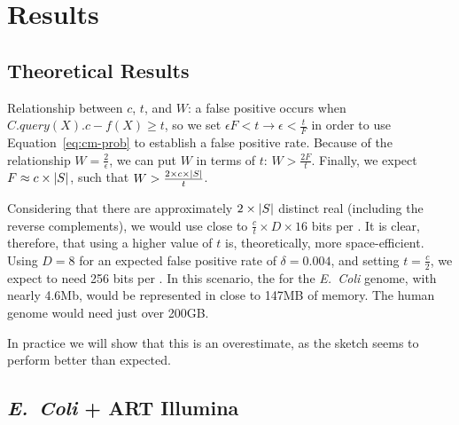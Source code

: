 \chapter{Results}

\section{Theoretical Results}


Relationship between $c$, $t$, and $W$: a false positive occurs when $C.\mathit{query}(X).c - f(X) \geq t$, so we set $\epsilon F < t \rightarrow \epsilon < \frac{t}{F}$ in order to use Equation~\ref{eq:cm-prob} to establish a false positive rate. Because of the relationship $W = \frac{2}{\epsilon}$, we can put $W$ in terms of $t$: $W > \frac{2F}{t}$. Finally, we expect $F \approx c \times |\strname{S}|$, such that $W > \frac{2 \times c \times |\strname{S}|}{t}$.

Considering that there are approximately $2 \times |\strname{S}|$ distinct real  (including the reverse complements), we would use close to  $\frac{c}{t} \times D \times 16$ bits per \kmer. It is clear, therefore, that using a higher value of $t$ is, theoretically, more space-efficient. Using $D = 8$ for an expected false positive rate of $\delta = 0.004$, and setting $t = \frac{c}{2}$, we expect to need 256 bits per \kmer. In this scenario, the \dBG for the \emph{E.~Coli} genome, with nearly 4.6Mb, would be represented in close to 147MB of memory. The human genome would need just over 200GB.

In practice we will show that this is an overestimate, as the sketch seems to perform better than expected.


\section{\emph{E.~Coli} + ART Illumina}

